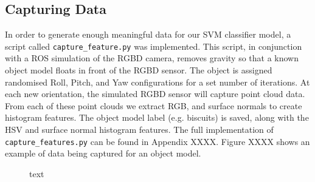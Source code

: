 \documentclass[a4paper]{article}
\begin{document}
\subsection{Capturing Data}
In order to generate enough meaningful data for our SVM classifier model, a script called \verb|capture_feature.py| was implemented. This script, in conjunction with a ROS simulation of the RGBD camera, removes gravity so that a known object model floats in front of the RGBD sensor. The object is assigned randomised Roll, Pitch, and Yaw configurations for a set number of iterations. At each new orientation, the simulated RGBD sensor will capture point cloud data. From each of these point clouds we extract RGB, and surface normals to create histogram features. The object model label (e.g. biscuits) is saved, along with the HSV and surface normal histogram features. The full implementation of \verb|capture_features.py| can be found in Appendix XXXX. Figure XXXX shows an example of data being captured for an object model.
\begin{figure}[h]
	\centering
	\caption{text}
\end{figure}
\end{document}

